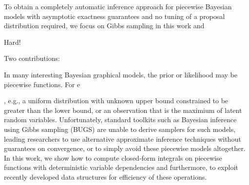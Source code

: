 \documentclass[letterpaper]{article}
\renewcommand{\-}{\text{-}}
\begin{document}
To obtain a completely automatic inference approach for piecewise
Bayesian models with asymptotic exactness guarantees and 
no tuning of a proposal distribution required, we focus on Gibbs sampling
in this work and 

%
%
%
%
%
Hard!

Two contributions:


In many interesting Bayesian graphical models, the prior or likelihood
may be piecewise functions.  For e

, e.g., a uniform distribution with unknown
upper bound constrained to be greater than the lower bound, or an
observation that is the maximium of latent random variables.
Unfortunately, standard toolkits such as Bayesian inference using
Gibbs sampling (BUGS) are unable to derive samplers for such models,
leading researchers to use alternative approximate inference
techniques without guarantees on convergence, or to simply avoid these
piecewise models altogether.  In this work, we show how to compute
closed-form integrals on piecewise functions with deterministic
variable dependencies and furthermore, to exploit recently developed
data structures for efficiency of these operations. 
\end{document}

